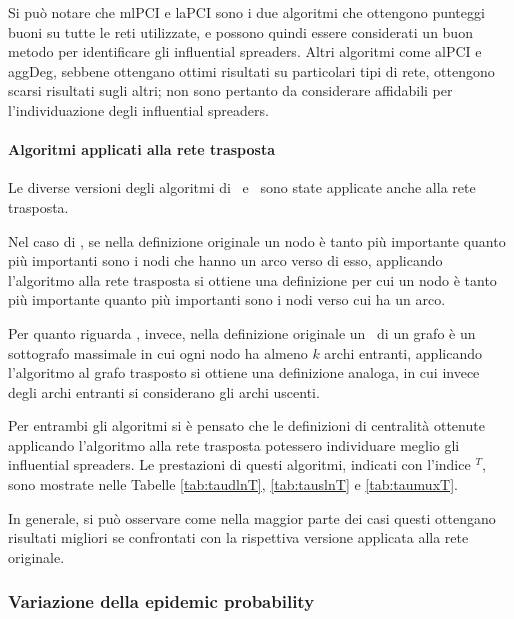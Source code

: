 Si può notare che mlPCI e laPCI sono i due algoritmi che ottengono punteggi buoni 
su tutte le reti utilizzate, e possono quindi essere considerati un buon metodo per identificare 
gli influential spreaders. 
Altri algoritmi come alPCI e aggDeg, sebbene ottengano ottimi risultati su
particolari tipi di rete, ottengono scarsi risultati sugli altri; non sono pertanto da 
considerare affidabili per l'individuazione degli influential spreaders.





\paragraph{Algoritmi applicati alla rete trasposta}
Le diverse versioni degli algoritmi di \PageRank\ e \kcore\ sono state applicate anche alla rete trasposta.

Nel caso di \PageRank, se nella definizione originale un nodo è tanto più importante quanto 
più importanti sono i nodi che hanno un arco verso di esso, applicando l'algoritmo alla rete trasposta si ottiene
una definizione per cui un nodo è tanto più importante quanto più importanti sono i nodi verso cui ha un arco.

Per quanto riguarda \kcore, invece, nella definizione originale un \kcore\ di un grafo è un sottografo 
massimale in cui ogni nodo ha almeno $k$ archi entranti, applicando l'algoritmo al grafo trasposto si ottiene 
una definizione analoga, in cui invece degli archi entranti si considerano gli archi uscenti.

Per entrambi gli algoritmi si è pensato che le definizioni di centralità ottenute applicando l'algoritmo 
alla rete trasposta potessero individuare meglio gli influential spreaders. Le prestazioni di questi algoritmi, indicati 
con l'indice $^T$, sono mostrate nelle Tabelle \ref{tab:taudlnT}, \ref{tab:tauslnT} e \ref{tab:taumuxT}.

In generale, si può osservare come nella maggior parte dei casi questi ottengano risultati migliori se confrontati con 
la rispettiva versione applicata alla rete originale. 






\subsubsection{Variazione della epidemic probability}

